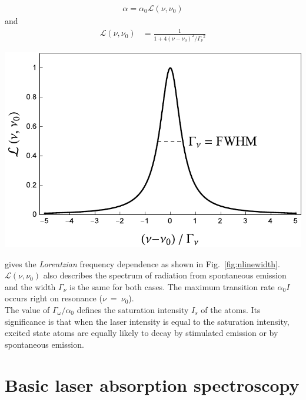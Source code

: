 \begin{minipage}[c][][c]{.45\textwidth}
\begin{align}
    \alpha = \alpha_0 \mathcal{L}(\nu,\nu_0)
\end{align}
and
\begin{align}
    \mathcal{L}(\nu,\nu_0) &= \frac{1}{ 1+4 {(\nu-\nu_0)}^2 / {\Gamma_\nu}^2 }
\end{align}
\end{minipage}
\hfill
\begin{minipage}[c]{.45\textwidth}
\includegraphics[width=\textwidth]{nLinewidth}
\end{minipage}
\bigskip

gives the \textit{Lorentzian} frequency dependence as shown in Fig.~\ref{fig:nlinewidth}.
\(\mathcal{L}(\nu,\nu_0) \) also describes the spectrum of radiation from spontaneous emission
and the width \(\Gamma_\nu \) is the same for both cases. The maximum transition rate 
\(\alpha_0 I \) occurs right on resonance (\(\nu~=~\nu_0 \)).\\
The value of \(\Gamma_\omega / \alpha_0 \) defines the saturation intensity \(I_{s} \) of the
atoms. Its significance is that when the laser intensity is equal to the saturation intensity,
excited state atoms are equally likely to decay by stimulated emission or by spontaneous emission.
\pagebreak

\section{Basic laser absorption spectroscopy}   %

